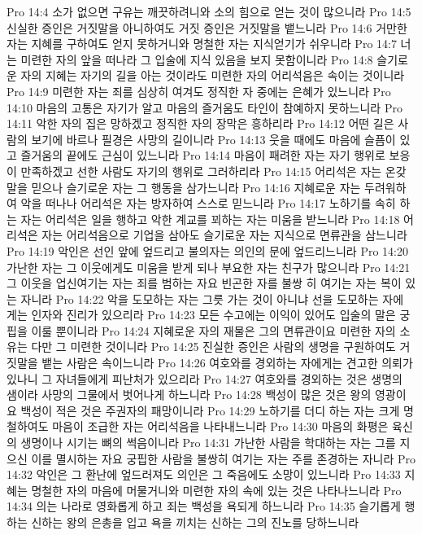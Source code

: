 Pro 14:4  소가 없으면 구유는 깨끗하려니와 소의 힘으로 얻는 것이 많으니라
Pro 14:5  신실한 증인은 거짓말을 아니하여도 거짓 증인은 거짓말을 뱉느니라
Pro 14:6  거만한 자는 지혜를 구하여도 얻지 못하거니와 명철한 자는 지식얻기가 쉬우니라
Pro 14:7  너는 미련한 자의 앞을 떠나라 그 입술에 지식 있음을 보지 못함이니라
Pro 14:8  슬기로운 자의 지혜는 자기의 길을 아는 것이라도 미련한 자의 어리석음은 속이는 것이니라
Pro 14:9  미련한 자는 죄를 심상히 여겨도 정직한 자 중에는 은혜가 있느니라
Pro 14:10  마음의 고통은 자기가 알고 마음의 즐거움도 타인이 참예하지 못하느니라
Pro 14:11  악한 자의 집은 망하겠고 정직한 자의 장막은 흥하리라
Pro 14:12  어떤 길은 사람의 보기에 바르나 필경은 사망의 길이니라
Pro 14:13  웃을 때에도 마음에 슬픔이 있고 즐거움의 끝에도 근심이 있느니라
Pro 14:14  마음이 패려한 자는 자기 행위로 보응이 만족하겠고 선한 사람도 자기의 행위로 그러하리라
Pro 14:15  어리석은 자는 온갖 말을 믿으나 슬기로운 자는 그 행동을 삼가느니라
Pro 14:16  지혜로운 자는 두려워하여 악을 떠나나 어리석은 자는 방자하여 스스로 믿느니라
Pro 14:17  노하기를 속히 하는 자는 어리석은 일을 행하고 악한 계교를 꾀하는 자는 미움을 받느니라
Pro 14:18  어리석은 자는 어리석음으로 기업을 삼아도 슬기로운 자는 지식으로 면류관을 삼느니라
Pro 14:19  악인은 선인 앞에 엎드리고 불의자는 의인의 문에 엎드리느니라
Pro 14:20  가난한 자는 그 이웃에게도 미움을 받게 되나 부요한 자는 친구가 많으니라
Pro 14:21  그 이웃을 업신여기는 자는 죄를 범하는 자요 빈곤한 자를 불쌍 히 여기는 자는 복이 있는 자니라
Pro 14:22  악을 도모하는 자는 그릇 가는 것이 아니냐 선을 도모하는 자에 게는 인자와 진리가 있으리라
Pro 14:23  모든 수고에는 이익이 있어도 입술의 말은 궁핍을 이룰 뿐이니라
Pro 14:24  지혜로운 자의 재물은 그의 면류관이요 미련한 자의 소유는 다만 그 미련한 것이니라
Pro 14:25  진실한 증인은 사람의 생명을 구원하여도 거짓말을 뱉는 사람은 속이느니라
Pro 14:26  여호와를 경외하는 자에게는 견고한 의뢰가 있나니 그 자녀들에게 피난처가 있으리라
Pro 14:27  여호와를 경외하는 것은 생명의 샘이라 사망의 그물에서 벗어나게 하느니라
Pro 14:28  백성이 많은 것은 왕의 영광이요 백성이 적은 것은 주권자의 패망이니라
Pro 14:29  노하기를 더디 하는 자는 크게 명철하여도 마음이 조급한 자는 어리석음을 나타내느니라
Pro 14:30  마음의 화평은 육신의 생명이나 시기는 뼈의 썩음이니라
Pro 14:31  가난한 사람을 학대하는 자는 그를 지으신 이를 멸시하는 자요 궁핍한 사람을 불쌍히 여기는 자는 주를 존경하는 자니라
Pro 14:32  악인은 그 환난에 엎드러져도 의인은 그 죽음에도 소망이 있느니라
Pro 14:33  지혜는 명철한 자의 마음에 머물거니와 미련한 자의 속에 있는 것은 나타나느니라
Pro 14:34  의는 나라로 영화롭게 하고 죄는 백성을 욕되게 하느니라
Pro 14:35  슬기롭게 행하는 신하는 왕의 은총을 입고 욕을 끼치는 신하는 그의 진노를 당하느니라
